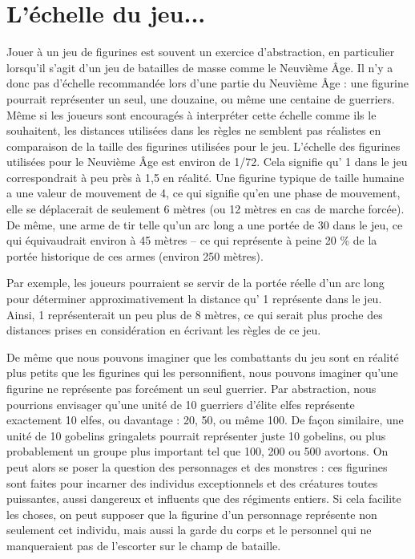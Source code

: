 \newpage
\section{L'échelle du jeu...}

Jouer à un jeu de figurines est souvent un exercice d'abstraction, en particulier lorsqu'il s'agit d'un jeu de batailles de masse comme le Neuvième Âge. Il n’y a donc pas d’échelle recommandée lors d’une partie du Neuvième Âge : une figurine pourrait représenter un seul, une douzaine, ou même une centaine de guerriers. Même si les joueurs sont encouragés à interpréter cette échelle comme ils le souhaitent, les distances utilisées dans les règles ne semblent pas réalistes en comparaison de la taille des figurines utilisées pour le jeu. L’échelle des figurines utilisées pour le Neuvième Âge est environ de 1/72. Cela signifie qu’ 1\pouce{} dans le jeu correspondrait à peu près à 1,5 \meter{} en réalité. Une figurine typique de taille humaine a une valeur de mouvement de 4\pouce{}, ce qui signifie qu’en une phase de mouvement, elle se déplacerait de seulement 6 mètres (ou 12 mètres en cas de marche forcée). De même, une arme de tir telle qu’un arc long a une portée de 30\pouce{} dans le jeu, ce qui équivaudrait environ à 45 mètres – ce qui représente à peine 20 \% de la portée historique de ces armes (environ 250 mètres).

Par exemple, les joueurs pourraient se servir de la portée réelle d’un arc long pour déterminer approximativement la distance qu’ 1\pouce{} représente dans le jeu. Ainsi, 1\pouce{} représenterait un peu plus de 8 mètres, ce qui serait plus proche des distances prises en considération en écrivant les règles de ce jeu.

De même que nous pouvons imaginer que les combattants du jeu sont en réalité plus petits que les figurines qui les personnifient, nous pouvons imaginer qu’une figurine ne représente pas forcément un seul guerrier. Par abstraction, nous pourrions envisager qu’une unité de 10 guerriers d’élite elfes représente exactement 10 elfes, ou davantage : 20, 50, ou même 100. De façon similaire, une unité de 10 gobelins gringalets pourrait représenter juste 10 gobelins, ou plus probablement un groupe plus important tel que 100, 200 ou 500 avortons. On peut alors se poser la question des personnages et des monstres : ces figurines sont faites pour incarner des individus exceptionnels et des créatures toutes puissantes, aussi dangereux et influents que des régiments entiers. Si cela facilite les choses, on peut supposer que la figurine d’un personnage représente non seulement cet individu, mais aussi la garde du corps et le personnel qui ne manqueraient pas de l’escorter sur le champ de bataille.

